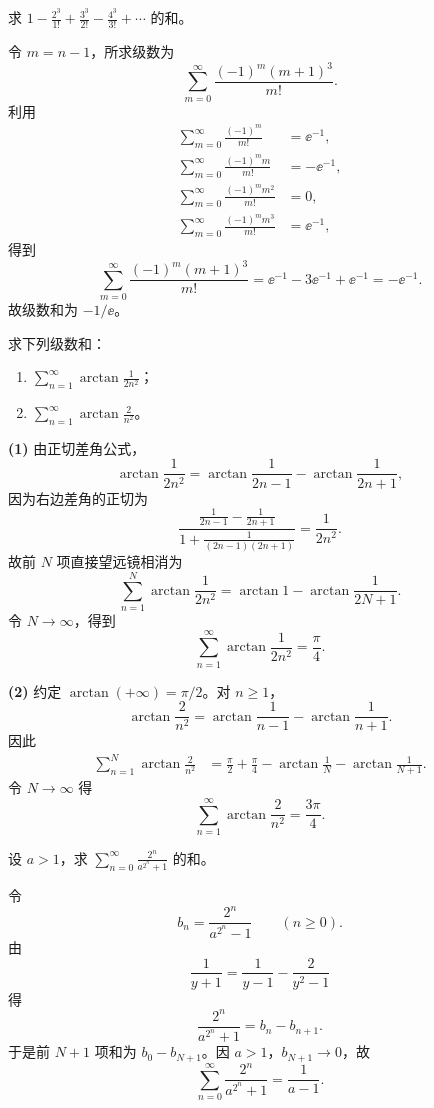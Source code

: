\begin{xexercise}[3]
求 $\displaystyle 1-\frac{2^3}{1!}+\frac{3^3}{2!}-\frac{4^3}{3!}+\cdots$ 的和。
\end{xexercise}
\begin{xsolution}
令 $m=n-1$，所求级数为
\[
  \sum_{m=0}^{\infty}\frac{(-1)^m(m+1)^3}{m!}.
\]
利用
\[
\begin{aligned}
  \sum_{m=0}^{\infty}\frac{(-1)^m}{m!}&=\ee^{-1},\\
  \sum_{m=0}^{\infty}\frac{(-1)^mm}{m!}&=-\ee^{-1},\\
  \sum_{m=0}^{\infty}\frac{(-1)^mm^2}{m!}&=0,\\
  \sum_{m=0}^{\infty}\frac{(-1)^mm^3}{m!}&=\ee^{-1},
\end{aligned}
\]
得到
\[
  \sum_{m=0}^{\infty}\frac{(-1)^m(m+1)^3}{m!}
  =\ee^{-1}-3\ee^{-1}+\ee^{-1}=-\ee^{-1}.
\]
故级数和为 $-1/\ee$。
\end{xsolution}


\begin{xexercise}[4]
求下列级数和：
\begin{enumerate}[label=(\arabic*)]
\item $\displaystyle\sum_{n=1}^{\infty}\arctan\frac1{2n^2}$；
\item $\displaystyle\sum_{n=1}^{\infty}\arctan\frac2{n^2}$。
\end{enumerate}
\end{xexercise}
\begin{xsolution}
\textbf{(1)}\quad
由正切差角公式，
\[
  \arctan\frac1{2n^2}
  =\arctan\frac1{2n-1}-\arctan\frac1{2n+1},
\]
因为右边差角的正切为
\[
  \frac{\frac1{2n-1}-\frac1{2n+1}}
  {1+\frac1{(2n-1)(2n+1)}}=\frac1{2n^2}.
\]
故前 $N$ 项直接望远镜相消为
\[
  \sum_{n=1}^N\arctan\frac1{2n^2}
  =\arctan1-\arctan\frac1{2N+1}.
\]
令 $N\to\infty$，得到
\[
  \sum_{n=1}^{\infty}\arctan\frac1{2n^2}=\frac\pi4.
\]

\textbf{(2)}\quad
约定 $\arctan(+\infty)=\pi/2$。对 $n\geqslant1$，
\[
  \arctan\frac2{n^2}
  =\arctan\frac1{n-1}-\arctan\frac1{n+1}.
\]
因此
\[
\begin{aligned}
  \sum_{n=1}^N\arctan\frac2{n^2}
  &=\frac\pi2+\frac\pi4
    -\arctan\frac1N-\arctan\frac1{N+1}.
\end{aligned}
\]
令 $N\to\infty$ 得
\[
  \sum_{n=1}^{\infty}\arctan\frac2{n^2}=\frac{3\pi}{4}.
\]
\end{xsolution}


\begin{xexercise}[5]
设 $a>1$，求 $\displaystyle\sum_{n=0}^{\infty}\frac{2^n}{a^{2^n}+1}$ 的和。
\end{xexercise}
\begin{xsolution}
令
\[
  b_n=\frac{2^n}{a^{2^n}-1}\qquad(n\geqslant0).
\]
由
\[
  \frac1{y+1}=\frac1{y-1}-\frac2{y^2-1}
\]
得
\[
  \frac{2^n}{a^{2^n}+1}=b_n-b_{n+1}.
\]
于是前 $N+1$ 项和为 $b_0-b_{N+1}$。因 $a>1$，$b_{N+1}\to0$，故
\[
  \sum_{n=0}^{\infty}\frac{2^n}{a^{2^n}+1}=\frac1{a-1}.
\]
\end{xsolution}



